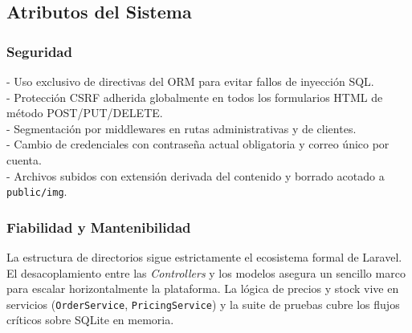 \documentclass[12pt, a4paper]{article}
\begin{document}
\subsection{Atributos del Sistema}
\subsubsection{Seguridad}
- Uso exclusivo de directivas del ORM para evitar fallos de inyección SQL. \\
- Protección CSRF adherida globalmente en todos los formularios HTML de método POST/PUT/DELETE. \\
- Segmentación por middlewares en rutas administrativas y de clientes. \\
- Cambio de credenciales con contraseña actual obligatoria y correo único por cuenta. \\
- Archivos subidos con extensión derivada del contenido y borrado acotado a \texttt{public/img}.

\subsubsection{Fiabilidad y Mantenibilidad}
La estructura de directorios sigue estrictamente el ecosistema formal de Laravel. El desacoplamiento entre las \textit{Controllers} y los modelos asegura un sencillo marco para escalar horizontalmente la plataforma. La lógica de precios y stock vive en servicios (\texttt{OrderService}, \texttt{PricingService}) y la suite de pruebas cubre los flujos críticos sobre SQLite en memoria.
\end{document}
